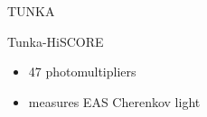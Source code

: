 \documentclass[18pt]{beamer}
\begin{document}
\begin{frame}{TUNKA}
\begin{minipage}[t]{0.48\textwidth}
\begin{block}{Tunka-HiSCORE}
    \begin{itemize}
      \setlength{\itemsep}{0pt}
      \item 47 photomultipliers
      \item measures EAS Cherenkov light
    \end{itemize}
  \end{block}
\end{minipage}


\end{frame}

\end{document}
